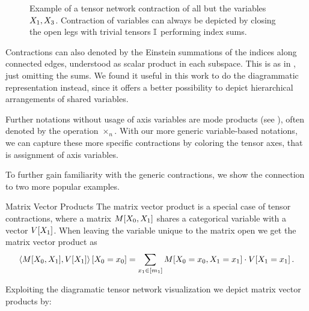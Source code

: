 \begin{figure}
	\begin{center}
		
	\end{center}
	\caption{
		Example of a tensor network contraction of all but the variables $X_{1},X_{3}$.
		Contraction of variables can always be depicted by closing the open legs with trivial tensors $\mathbb{I}$ performing index sums.
	}\label{fig:contraction}
\end{figure}


\begin{remark}[Alternative Notations]
	Contractions can also denoted by the Einstein summations of the indices along connected edges, understood as scalar product in each subspace.
	This is as in , just omitting the sums.
	We found it useful in this work to do the diagrammatic representation instead, since it offers a better possibility to depict hierarchical arrangements of shared variables.
\end{remark}


Further notations without usage of axis variables are mode products (see \cite{kolda_tensor_2009,hackbusch_tensor_2012,cichocki_tensor_2015}), often denoted by the operation $\times_n$.
With our more generic variable-based notations, we can capture these more specific contractions by coloring the tensor axes, that is assignment of axis variables.

To further gain familiarity with the generic contractions, we show the connection to two more popular examples.

\begin{example}{Matrix Vector Products}
	The matrix vector product is a special case of tensor contractions, where a matrix $M[X_{0},X_{1}]$ shares a categorical variable with a vector $V[X_{1}]$.
	When leaving the variable unique to the matrix open we get the matrix vector product as
		\[ \left\langle M[X_{0},X_{1}],V[X_{1}]\right\rangle \left[ X_{0}=x_{0} \right] = \sum_{x_{1}\in[m_{1}]} M[X_{0}=x_{0},X_{1}=x_{1}] \cdot V[X_{1}=x_{1}] \, .  \]

	Exploiting the diagramatic tensor network visualization we depict matrix vector products by:
	\begin{center}
		
	\end{center}
\end{example}


